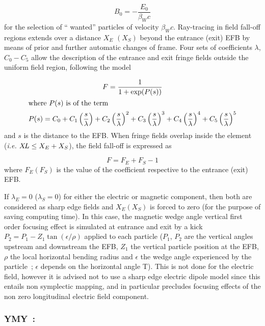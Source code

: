  $$ B_0= - \dfrac{E_0 }{ \beta_ Wc} $$
%
 for the selection of `` wanted''  particles of velocity $\beta_Wc $. Ray-tracing in 
field fall-off regions extends over a distance $ X_E $ $ (X_S) $ beyond the
entrance (exit) EFB by means of prior and further automatic changes of frame. Four sets
of coefficients $\lambda$, $ C_0-C_5 $ allow the description of the entrance and exit fringe 
fields outside the uniform field region, following the model~\cite{Biblio12} %

\begin{gather*}
	F = \dfrac{1 }{ 1+ \exp(P(s))} \\
	\intertext{where $  P(s) $ is of the term}
	    P(s) = C_0
	       +C_1 \left(  \dfrac{s }{ \lambda} \right) 
	       +C_2 \left( \dfrac{s }{ \lambda} \right)^2 
	       + C_3 \left( \dfrac{s }{ \lambda} \right)^3 
	       +C_4 \left( \dfrac{s }{ \lambda} \right)^4 
	       + C_5 \left(\dfrac{s }{ \lambda} \right)^5 
\end{gather*}
%
and $ s $ is the distance to the EFB.  When fringe fields overlap
inside the element (\emph{i.e.} $ X\!L\leq X_E+X_S$),  the field fall-off is expressed as

$$ F = F_E + F_S -1 $$
%
 where $ F_E(F_S) $ is the value of the coefficient respective to the entrance (exit) EFB. 
 
\noindent If $ \lambda_ E=0 $  ($\lambda_ S=0$)  for either the electric or
magnetic component, then both are considered as sharp edge fields and $ X_E(X_S) $ is forced 
to zero (for the purpose of saving computing time).  In this case, the magnetic wedge angle vertical first order focusing effect is simulated at entrance and exit by a kick $P_2 = P_1 - Z_1 \tan (\epsilon / \rho)$ applied to each particle ($P_1$, $P_2$ are the vertical angles upstream and downstream the EFB, $Z_1$ the vertical particle position at the EFB, $\rho$ the local horizontal bending radius and $\epsilon$ the wedge angle experienced by the particle~; $\epsilon$ depends on the horizontal angle T). This is not done for the electric field, however it is advised not to use a sharp edge electric dipole model since this entails non symplectic mapping, and in particular precludes focusing effects of the non zero longitudinal electric field component.

\newpage

\subsubsection*{YMY~: \YMYTitl} \label{YMY} 

